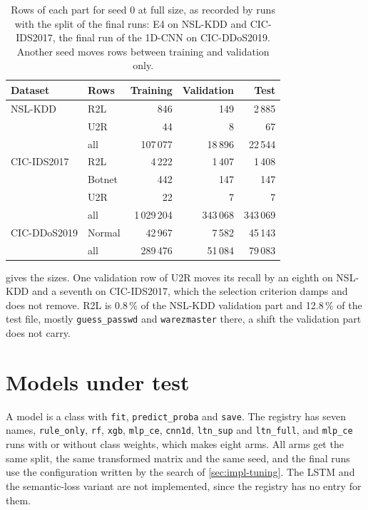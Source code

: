 \begin{table}[t]
\centering
\footnotesize
\caption{Rows of each part for seed 0 at full size, as recorded by runs with the split of the
final runs: E4 on NSL-KDD and CIC-IDS2017, the final run of the 1D-CNN on CIC-DDoS2019. Another
seed moves rows between training and validation only.}
\label{tab:impl-splits}
\setlength{\tabcolsep}{5pt}
\begin{tabular}{@{}llrrr@{}}
\toprule
Dataset & Rows & Training & Validation & Test \\
\midrule
NSL-KDD & R2L & 846 & 149 & 2\,885 \\
 & U2R & 44 & 8 & 67 \\
 & all & 107\,077 & 18\,896 & 22\,544 \\
\midrule
CIC-IDS2017 & R2L & 4\,222 & 1\,407 & 1\,408 \\
 & Botnet & 442 & 147 & 147 \\
 & U2R & 22 & 7 & 7 \\
 & all & 1\,029\,204 & 343\,068 & 343\,069 \\
\midrule
CIC-DDoS2019 & Normal & 42\,967 & 7\,582 & 45\,143 \\
 & all & 289\,476 & 51\,084 & 79\,083 \\
\bottomrule
\end{tabular}
\end{table}

 gives the sizes. One validation row of U2R moves its recall by an eighth
on NSL-KDD and a seventh on CIC-IDS2017, which the selection criterion damps and does not remove.
R2L is 0.8\,\% of the NSL-KDD validation part and 12.8\,\% of the test file, mostly
\texttt{guess\_passwd} and \texttt{warezmaster} there, a shift the validation part does not carry.

\section{Models under test}
\label{sec:impl-models}

A model is a class with \texttt{fit}, \texttt{predict\_proba} and \texttt{save}. The registry
has seven names, \texttt{rule\_only}, \texttt{rf}, \texttt{xgb}, \texttt{mlp\_ce},
\texttt{cnn1d}, \texttt{ltn\_sup} and \texttt{ltn\_full}, and \texttt{mlp\_ce} runs with or
without class weights, which makes eight arms. All arms get the same split, the same transformed
matrix and the same seed, and the final runs use the configuration written by the search of
\cref{sec:impl-tuning}. The LSTM and the semantic-loss variant are not implemented, since the
registry has no entry for them.

